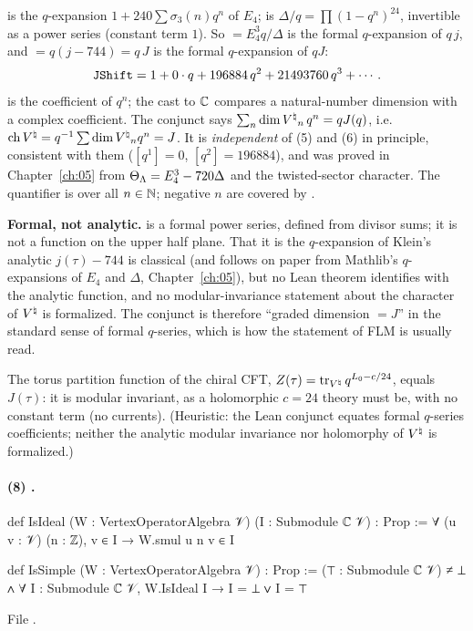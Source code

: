 \begin{dictionary}
 is the $q$-expansion $1+240\sum\sigma_3(n)q^n$ of $E_4$;  is $\Delta/q=\prod(1-q^n)^{24}$,
invertible as a power series (constant term $1$).  So  $=E_4^3q/\Delta$ is the formal
$q$-expansion of $q\,j$, and  $=q(j-744)=q\,J$ is the formal $q$-expansion of $qJ$:
\begin{equation*}
 \lean{JShift}=1+0\cdot q+196884\,q^2+21493760\,q^3+\cdots .
\end{equation*}
 is the coefficient of $q^n$; the cast to ${\mathbb{C}}$ compares a natural-number dimension with
a complex coefficient.  The conjunct says $\sum_n\dim{V^{\natural}}_n\,q^n=qJ(q)$, i.e.\ $\operatorname{ch}{V^{\natural}}=q^{-1}\sum\dim{V^{\natural}}_nq^n=J$.
It is \emph{independent} of (5) and (6) in principle, consistent with them ($[q^1]=0$, $[q^2]=196884$),
and was proved in Chapter~\ref{ch:05} from $\Theta_{\Lambda}=E_4^3-720\Delta$ and the twisted-sector character.
The quantifier is over all $n\in{\mathbb{N}}$; negative $n$ are covered by .

\textbf{Formal, not analytic.}   is a formal power series, defined from divisor sums; it is
not a function on the upper half plane.  That it is the $q$-expansion of Klein's analytic
$j(\tau)-744$ is classical (and follows on paper from Mathlib's $q$-expansions of $E_4$ and $\Delta$,
Chapter~\ref{ch:05}), but no Lean theorem identifies  with the analytic function, and no
modular-invariance statement about the character of ${V^{\natural}}$ is formalized.  The conjunct is therefore
``graded dimension $=J$'' in the standard sense of formal $q$-series, which is how the statement of
FLM is usually read.
\end{dictionary}

\begin{physics}
The torus partition function of the chiral CFT, $Z(\tau)=\operatorname{tr}_{{V^{\natural}}}q^{L_0-c/24}$, equals $J(\tau)$: it is
modular invariant, as a holomorphic $c=24$ theory must be, with no constant term (no currents).
(Heuristic: the Lean conjunct equates formal $q$-series coefficients; neither the analytic modular
invariance nor holomorphy of ${V^{\natural}}$ is formalized.)
\end{physics}

\paragraph{(8) .}
\begin{leancode}
def IsIdeal (W : VertexOperatorAlgebra 𝒱) (I : Submodule ℂ 𝒱) : Prop :=
  ∀ (u v : 𝒱) (n : ℤ), v ∈ I → W.smul u n v ∈ I

def IsSimple (W : VertexOperatorAlgebra 𝒱) : Prop :=
  (⊤ : Submodule ℂ 𝒱) ≠ ⊥ ∧ ∀ I : Submodule ℂ 𝒱, W.IsIdeal I → I = ⊥ ∨ I = ⊤
\end{leancode}
File .

